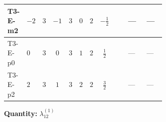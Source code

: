 \documentclass[8pt]{article}
\begin{document}
\begin{landscape}
\begin{longtable}{@{}llcccccc >{\raggedright\arraybackslash}p{0.21\linewidth} >{\raggedright\arraybackslash}p{0.21\linewidth} >{\raggedright\arraybackslash}p{0.21\linewidth}@{}}
\midrule
T3-E-m2 & $-2$ & $3$ & $-1$ & $3$ & $0$ & $2$ & $-\frac{1}{2}$ & \scriptsize\adjustbox{max width=\linewidth}{$\begin{gathered} +4 {\lambda_{HS_1}^{(1)}} {\lambda_{HS_2}^{(1)}}\end{gathered}$} & --- & --- \\
\midrule
T3-E-p0 & $0$ & $3$ & $0$ & $3$ & $1$ & $2$ & $\frac{1}{2}$ & \scriptsize\adjustbox{max width=\linewidth}{$\begin{gathered} +4 {\lambda_{HS_1}^{(1)}} {\lambda_{HS_2}^{(1)}}\end{gathered}$} & --- & --- \\
\midrule
T3-E-p2 & $2$ & $3$ & $1$ & $3$ & $2$ & $2$ & $\frac{3}{2}$ & \scriptsize\adjustbox{max width=\linewidth}{$\begin{gathered} +4 {\lambda_{HS_1}^{(1)}} {\lambda_{HS_2}^{(1)}}\end{gathered}$} & --- & --- \\
\midrule
\bottomrule
\end{longtable}
\clearpage
\noindent\textbf{Quantity: }$\lambda_{12}^{(1)}$\par\smallskip

\end{landscape}
\end{document}
